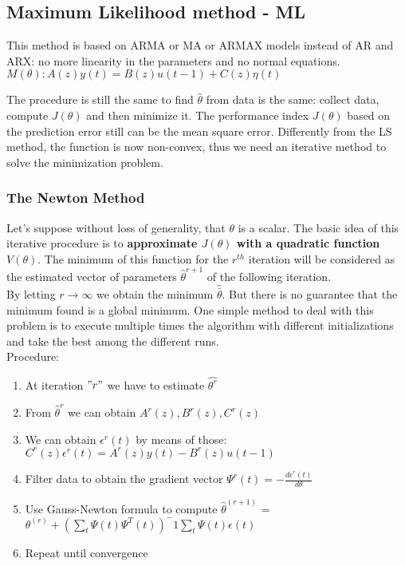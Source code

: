 \documentclass[10pt,a4paper]{article}
\begin{document}
\subsection{Maximum Likelihood method - ML}
This method is based on ARMA or MA or ARMAX models instead of AR and ARX: no more linearity in the parameters and no normal equations. \\
\center $M(\theta): A(z)y(t)=B(z)u(t-1)+C(z)\eta(t)$
\\ \raggedright \vspace{0.3em}
The procedure is still the same to find $\hat{\theta}$ from data is the same: collect data, compute $J(\theta)$ and then minimize it.
The performance index $J(\theta)$ based on the prediction error still can be the mean square error. Differently from the LS method, the function is now non-convex, thus we need an iterative method to solve the minimization problem.
\subsubsection{The Newton Method}
Let's suppose without loss of generality, that $\theta$ is a scalar. The basic idea of this iterative procedure is to \textbf{approximate $J(\theta)$ with a quadratic function $V(\theta)$}. The minimum of this function for the $r^{th}$ iteration will be considered as the estimated vector of parameters $\hat{\theta}^{r+1}$ of the following iteration. \\ By letting $r \rightarrow \infty$ we obtain the minimum $\hat{\bar{\theta}}$. But there is no guarantee that the minimum found is a global minimum. One simple method to deal with this problem is to execute multiple times the algorithm with different initializations and take the best among the different runs. \\
Procedure:
\begin{enumerate}
	\item At iteration $"r"$ we have to estimate $\hat{\theta^r}$
	\item From $\hat{\theta}^r$ we can obtain $A^r(z),B^r(z),C^r(z)$
	\item We can obtain $\epsilon^r(t)$ by means of those: $C^r(z)\epsilon^r(t)=A^r(z)y(t)-B^r(z)u(t-1)$
	\item Filter data to obtain the gradient vector $\Psi^r(t) = - \frac{d\epsilon^r(t)}{d\theta}$
	\item Use Gauss-Newton formula to compute $\hat{\theta}^{(r+1)}$ = $\theta^{(r)}+(\sum_t\Psi(t)\Psi^T(t))^-1\sum_t\Psi(t)\epsilon(t)$
	\item Repeat until convergence
\end{enumerate}
\end{document}
